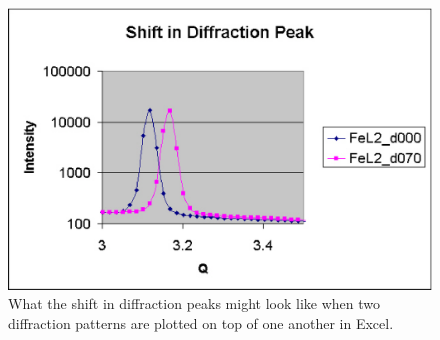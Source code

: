 \begin{figure}
    \centering
    \includegraphics[scale=.5]
    {figures/excel_peak_shift.eps}
    \caption{What the shift in diffraction peaks might
    look like when two diffraction patterns are plotted
    on top of one another in Excel.}
    \label{excel_peak_shift}
\end{figure}
